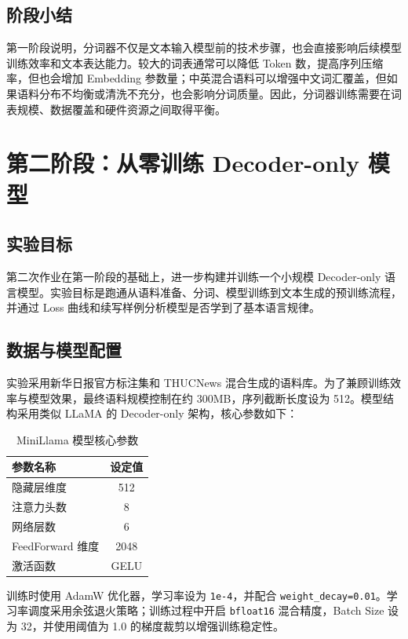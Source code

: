 \documentclass[a4paper,12pt]{ctexart}
\begin{document}
\subsection{阶段小结}

第一阶段说明，分词器不仅是文本输入模型前的技术步骤，也会直接影响后续模型训练效率和文本表达能力。较大的词表通常可以降低 Token 数，提高序列压缩率，但也会增加 Embedding 参数量；中英混合语料可以增强中文词汇覆盖，但如果语料分布不均衡或清洗不充分，也会影响分词质量。因此，分词器训练需要在词表规模、数据覆盖和硬件资源之间取得平衡。

\section{第二阶段：从零训练 Decoder-only 模型}

\subsection{实验目标}

第二次作业在第一阶段的基础上，进一步构建并训练一个小规模 Decoder-only 语言模型。实验目标是跑通从语料准备、分词、模型训练到文本生成的预训练流程，并通过 Loss 曲线和续写样例分析模型是否学到了基本语言规律。

\subsection{数据与模型配置}

实验采用新华日报官方标注集和 THUCNews 混合生成的语料库。为了兼顾训练效率与模型效果，最终语料规模控制在约 300MB，序列截断长度设为 512。模型结构采用类似 LLaMA 的 Decoder-only 架构，核心参数如下：

\begin{table}[H]
    \centering
    \begin{tabular}{lc}
        \toprule
        参数名称 & 设定值 \\
        \midrule
        隐藏层维度 & 512 \\
        注意力头数 & 8 \\
        网络层数 & 6 \\
        FeedForward 维度 & 2048 \\
        激活函数 & GELU \\
        \bottomrule
    \end{tabular}
    \caption{MiniLlama 模型核心参数}
\end{table}

训练时使用 AdamW 优化器，学习率设为 \texttt{1e-4}，并配合 \texttt{weight\_decay=0.01}。学习率调度采用余弦退火策略；训练过程中开启 \texttt{bfloat16} 混合精度，Batch Size 设为 32，并使用阈值为 1.0 的梯度裁剪以增强训练稳定性。
\end{document}
